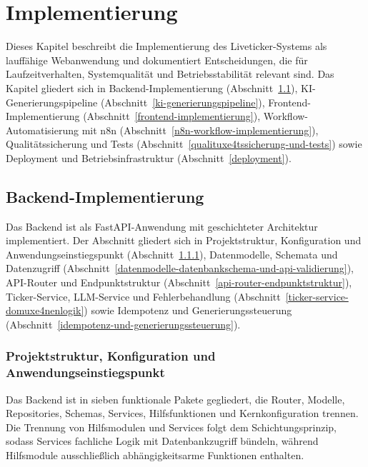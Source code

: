\chapter{Implementierung}\label{implementierung}

Dieses Kapitel beschreibt die Implementierung des Liveticker-Systems als lauffähige Webanwendung und dokumentiert Entscheidungen, die für Laufzeitverhalten, Systemqualität und Betriebsstabilität relevant sind. Das Kapitel gliedert sich in Backend-Implementierung (Abschnitt~\ref{backend-implementierung}), KI-Generierungspipeline (Abschnitt~\ref{ki-generierungspipeline}), Frontend-Implementierung (Abschnitt~\ref{frontend-implementierung}), Workflow-Automatisierung mit n8n (Abschnitt~\ref{n8n-workflow-implementierung}), Qualitätssicherung und Tests (Abschnitt~\ref{qualituxe4tssicherung-und-tests}) sowie Deployment und Betriebsinfrastruktur (Abschnitt~\ref{deployment}).

\section{Backend-Implementierung}\label{backend-implementierung}

Das Backend ist als FastAPI-Anwendung mit geschichteter Architektur implementiert. Der Abschnitt gliedert sich in Projektstruktur, Konfiguration und Anwendungseinstiegspunkt (Abschnitt~\ref{projektstruktur-und-application-entry-point}), Datenmodelle, Schemata und Datenzugriff (Abschnitt~\ref{datenmodelle-datenbankschema-und-api-validierung}), API-Router und Endpunktstruktur (Abschnitt~\ref{api-router-endpunktstruktur}), Ticker-Service, LLM-Service und Fehlerbehandlung (Abschnitt~\ref{ticker-service-domuxe4nenlogik}) sowie Idempotenz und Generierungssteuerung (Abschnitt~\ref{idempotenz-und-generierungssteuerung}).

\subsection{Projektstruktur, Konfiguration und Anwendungseinstiegspunkt}\label{projektstruktur-und-application-entry-point}

Das Backend ist in sieben funktionale Pakete gegliedert, die Router, Modelle, Repositories, Schemas, Services, Hilfsfunktionen und Kernkonfiguration trennen. Die Trennung von Hilfsmodulen und Services folgt dem Schichtungsprinzip, sodass Services fachliche Logik mit Datenbankzugriff bündeln, während Hilfsmodule ausschließlich abhängigkeitsarme Funktionen enthalten.

